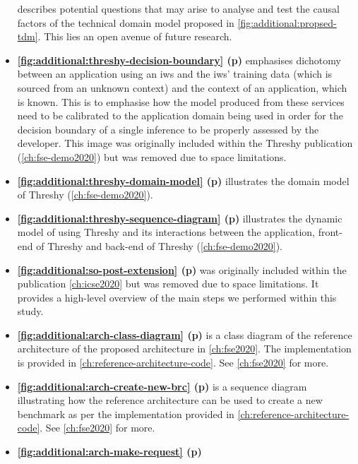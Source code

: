 \begin{itemize}
  describes potential questions that may arise to analyse and test the causal factors of the technical domain model proposed in \cref{fig:additional:propsed-tdm}. This lies an open avenue of future research.
\item \textbf{\cref{fig:additional:threshy-decision-boundary} (p\pageref{fig:additional:threshy-decision-boundary})}
  emphasises dichotomy between an application using an \gls{iws} and the \gls{iws}' training data (which is sourced from an unknown context) and the context of an application, which is known. This is to emphasise how the model produced from these services need to be calibrated to the application domain being used in order for the decision boundary of a single inference to be properly assessed by the developer. This image was originally included within the Threshy publication (\cref{ch:fse-demo2020}) but was removed due to space limitations.
\item \textbf{\cref{fig:additional:threshy-domain-model} (p\pageref{fig:additional:threshy-domain-model})}
  illustrates the domain model of Threshy (\cref{ch:fse-demo2020}).
\item \textbf{\cref{fig:additional:threshy-sequence-diagram} (p\pageref{fig:additional:threshy-sequence-diagram})}
  illustrates the dynamic model of using Threshy and its interactions between the application, front-end of Threshy and back-end of Threshy (\cref{ch:fse-demo2020}).
\item \textbf{\cref{fig:additional:so-post-extension} (p\pageref{fig:additional:so-post-extension})}
  was originally included within the publication \cref{ch:icse2020} but was removed due to space limitations. It provides a high-level overview of the main steps we performed within this study.
\item \textbf{\cref{fig:additional:arch-class-diagram} (p\pageref{fig:additional:arch-class-diagram})}
  is a class diagram of the reference architecture of the proposed architecture in \cref{ch:fse2020}. The implementation is provided in \cref{ch:reference-architecture-code}. See \cref{ch:fse2020} for more.
\item \textbf{\cref{fig:additional:arch-create-new-brc} (p\pageref{fig:additional:arch-create-new-brc})}
  is a sequence diagram illustrating how the reference architecture can be used to create a new benchmark as per the implementation provided in \cref{ch:reference-architecture-code}. See \cref{ch:fse2020} for more.
\item \textbf{\cref{fig:additional:arch-make-request} (p\pageref{fig:additional:arch-make-request})}

\end{itemize}

